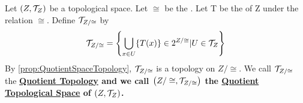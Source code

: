 \label{def:QuotientSpaceTopology}
\newcommand{\QuotientSpaceTopology}[0]{
    \bf \hyperref[def:QuotientSpaceTopology]{Quotient Topology} \rm
}
\newcommand{\QuotientTopologicalSpace}[0]{
    \bf \hyperref[def:QuotientSpaceTopology]{Quotient Topological Space} \rm 
}

\begin{df}
    Let $(Z,\mathcal{T}_Z)$ be a topological space. 
    Let $\cong$ be the . 
    Let T be the \QuotientMap of Z under the relation $\cong$. 
    Define $\mathcal{T}_{Z/\cong}$ by
    \begin{equation}
        \mathcal{T}_{Z/\cong} = \left\{ \bigcup_{x \in U}\{T(x)\} \in 2^{Z/\cong}| U \in \mathcal{T}_Z \right\}
    \end{equation}
    By \ref{prop:QuotientSpaceTopology}, $\mathcal{T}_{Z/\cong}$ is a topology on $Z/\cong$.
    We call $\mathcal{T}_{Z/\cong}$ the \QuotientSpaceTopology and we call $\left( Z/\cong, \mathcal{T}_{Z/\cong}\right)$ the \QuotientTopologicalSpace of $(Z, \mathcal{T}_Z)$.
    
\end{df}